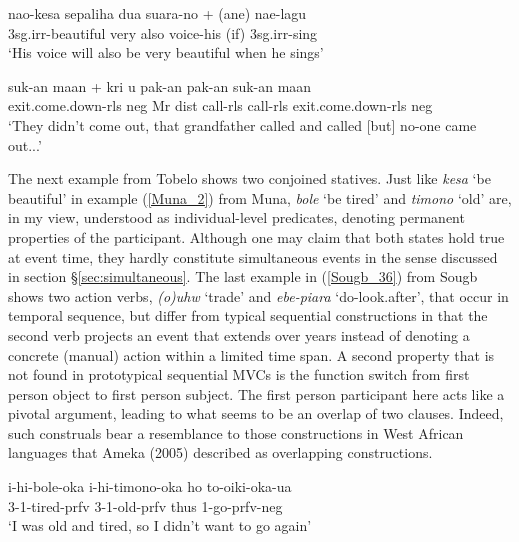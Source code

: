 \ea \label{Muna_2}
\gll nao-kesa sepaliha dua suara-no + (ane) nae-lagu \\
3\acs{sg}.\acs{irr}-beautiful very also voice-his (if) 3\acs{sg}.\acs{irr}-sing \\
\glft `His voice will also be very beautiful when he sings' \\ 
\z
\xe

\ea \label{Teiwa_74}
\gll suk-an maan + kri u pak-an pak-an suk-an maan \\
exit.come.down-\acs{rls} \acs{neg} Mr \acs{dist} call-\acs{rls} call-\acs{rls} exit.come.down-\acs{rls} \acs{neg} \\
\glft `They didn't come out, that grandfather called and called [but] no-one came out...' \\ 
\z
\xe

The next example from Tobelo shows two conjoined statives. Just like \textit{kesa} `be beautiful' in example (\ref{Muna_2}) from Muna, \textit{bole} `be tired' and \textit{timono} `old' are, in my view, understood as individual-level predicates, denoting permanent properties of the participant. Although one may claim that both states hold true at event time, they hardly constitute simultaneous events in the sense discussed in section §\ref{sec:simultaneous}. The last example in (\ref{Sougb_36}) from Sougb shows two action verbs, \textit{(o)uhw} `trade' and \textit{ebe-piara} `do-look.after', that occur in temporal sequence, but differ from typical sequential constructions in that the second verb projects an event that extends over years instead of denoting a concrete (manual) action within a limited time span. A second property that is not found in prototypical sequential MVCs is the function switch from first person object to first person subject. The first person participant here acts like a pivotal argument, leading to what seems to be an overlap of two clauses. Indeed, such construals bear a resemblance to those constructions in West African languages that Ameka (2005) described as overlapping constructions.

\ea \label{}
\gll i-hi-bole-oka i-hi-timono-oka ho to-oiki-oka-ua \\
3-1-tired-\acs{prfv} 3-1-old-\acs{prfv} thus 1-go-\acs{prfv}-\acs{neg} \\
\glft `I was old and tired, so I didn't want to go again' \\ 
\z
\xe

